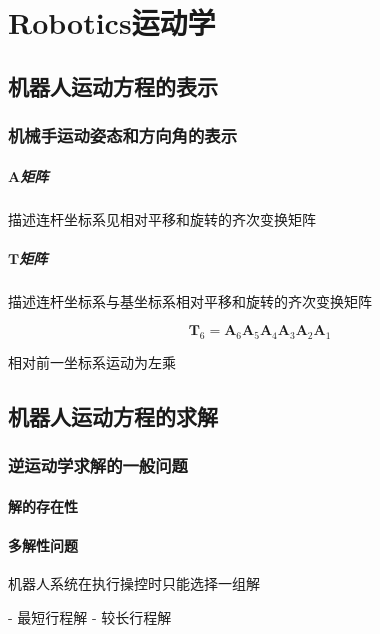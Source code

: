 \documentclass[11pt]{book}
\begin{document}
\chapter{Robotics运动学}
\section{机器人运动方程的表示}

\subsection{机械手运动姿态和方向角的表示}

\paragraph{$\boldsymbol{A}$矩阵}%
\label{par:_a_ju_zhen_}

描述连杆坐标系见相对平移和旋转的齐次变换矩阵

\paragraph{$\boldsymbol{T}$矩阵}%
\label{par:_t_ju_zhen_}

描述连杆坐标系与基坐标系相对平移和旋转的齐次变换矩阵

$$
	\boldsymbol{T}_6 = \boldsymbol{A}_6 \boldsymbol{A}_5 \boldsymbol{A}_4 \boldsymbol{A}_3 \boldsymbol{A}_2 \boldsymbol{A}_1
$$

相对前一坐标系运动为左乘

\section{机器人运动方程的求解}

\subsection{逆运动学求解的一般问题}

\subsubsection{解的存在性}

\subsubsection{多解性问题}


机器人系统在执行操控时只能选择一组解

- 最短行程解
- 较长行程解
\end{document}

